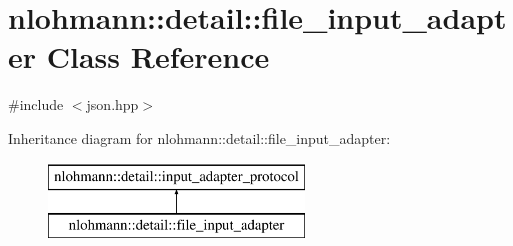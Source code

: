 \hypertarget{classnlohmann_1_1detail_1_1file__input__adapter}{}\section{nlohmann\+:\+:detail\+:\+:file\+\_\+input\+\_\+adapter Class Reference}
\label{classnlohmann_1_1detail_1_1file__input__adapter}


{\ttfamily \#include $<$json.\+hpp$>$}

Inheritance diagram for nlohmann\+:\+:detail\+:\+:file\+\_\+input\+\_\+adapter\+:\begin{figure}[H]
\begin{center}
\leavevmode
\includegraphics[height=2.000000cm]{classnlohmann_1_1detail_1_1file__input__adapter}
\end{center}
\end{figure}
